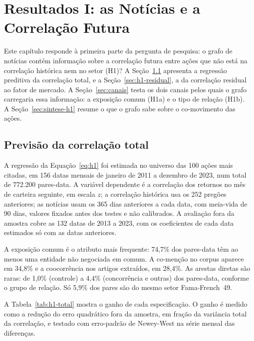 \chapter{Resultados I: as Notícias e a Correlação Futura}
\label{cap:res-correlacao}

Este capítulo responde à primeira parte da pergunta de pesquisa: o grafo de notícias contém informação
sobre a correlação futura entre ações que não está na correlação histórica nem no setor (H1)? A
Seção~\ref{sec:h1} apresenta a regressão preditiva da correlação total, e a Seção~\ref{sec:h1-residual},
a da correlação residual ao fator de mercado. A Seção~\ref{sec:canais} testa os dois canais pelos quais
o grafo carregaria essa informação: a exposição comum (H1a) e o tipo de relação (H1b). A
Seção~\ref{sec:sintese-h1} resume o que o grafo sabe sobre o co-movimento das ações.

\section{Previsão da correlação total}
\label{sec:h1}

A regressão da Equação~\eqref{eq:h1} foi estimada no universo das 100 ações mais citadas, em 156 datas
mensais de janeiro de 2011 a dezembro de 2023, num total de 772.200 pares-data. A variável dependente é a
correlação dos retornos no mês de carteira seguinte, em escala $z$; a correlação histórica usa os 252
pregões anteriores; as notícias usam os 365 dias anteriores a cada data, com meia-vida de 90 dias, valores
fixados antes dos testes e não calibrados. A avaliação fora da amostra cobre as 132 datas de 2013 a 2023,
com os coeficientes de cada data estimados só com as datas anteriores.

A exposição comum é o atributo mais frequente: 74,7\% dos pares-data têm ao menos uma entidade não
negociada em comum. A co-menção no corpus aparece em 34,8\% e a coocorrência nos artigos extraídos, em
28,4\%. As arestas diretas são raras: de 1,0\% (controle) a 4,4\% (concorrência e outras) dos pares-data,
conforme o grupo de relação. Só 5,9\% dos pares são do mesmo setor Fama-French~49.

A Tabela~\ref{tab:h1-total} mostra o ganho de cada especificação. O ganho é medido como a redução do erro
quadrático fora da amostra, em fração da variância total da correlação, e testado com erro-padrão de
Newey-West na série mensal das diferenças.


